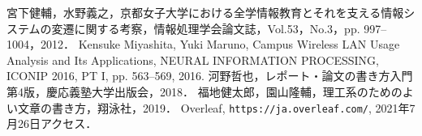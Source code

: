 \documentclass[a4paper,twocolumn,10pt]{ltjsarticle}
\begin{document}
\begin{thebibliography}{99}
  宮下健輔，水野義之，京都女子大学における全学情報教育とそれを支える情報システムの変遷に関する考察，情報処理学会論文誌，Vol.53，No.3，pp. 997--1004，2012．
  Kensuke Miyashita, Yuki Maruno, Campus Wireless LAN Usage Analysis and Its Applications, NEURAL INFORMATION PROCESSING, ICONIP 2016, PT I, pp. 563--569, 2016.
  河野哲也，レポート・論文の書き方入門 第4版，慶応義塾大学出版会，2018．
  福地健太郎，園山隆輔，理工系のためのよい文章の書き方，翔泳社，2019．
  Overleaf, {\tt https://ja.overleaf.com/}, 2021年7月26日アクセス．
\end{thebibliography}
\end{document}

